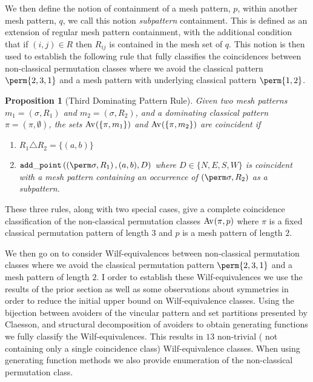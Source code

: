 \documentclass[11pt,a4paper]{article}
\newtheorem{proposition}[theorem]{Proposition}
\begin{document}
We then define the notion of containment of a mesh pattern, \(p\), within
another mesh pattern, \(q\), we call this notion \emph{subpattern} containment.
This is defined as an extension of regular mesh pattern containment, with the
additional condition that if \((i,j)\in R\text{ then } R_{ij}\) is contained in
the mesh set of \(q\). This notion is then used to establish the following rule
that fully classifies the coincidences between non-classical permutation classes
where we avoid the classical pattern \(\perm{2,3,1}\) and a mesh pattern with
underlying classical pattern \(\perm{1,2}\).
\begin{proposition}[Third Dominating Pattern Rule]
    \label{prop:dom3}
    Given two mesh patterns \(m_1 =(\sigma, R_1)\) and \(m_2 = (\sigma, R_2)\),
    and a dominating classical pattern \(\pi = (\pi,\emptyset)\), the sets
    \(\operatorname{Av}_{}\!\left(\{\pi,m_1\}\right)\) and \(\operatorname{Av}_{}\!\left(\{\pi,m_2\}\right)\) are coincident if
    \begin{enumerate}
        \item \(R_1 \triangle R_2 = \{(a,b)\}\)
        \item\label{prop:dom3:condocc} \(\addp[D]{\mperm{\sigma}{R_1}}{(a,b)}\)
            where \(D\in\{N,E,S,W\}\)
            is coincident with a mesh pattern containing an occurrence of
            \(\mperm{\sigma}{R_2}\) as a subpattern.
    \end{enumerate}
\end{proposition}

These three rules, along with two special cases, give a complete coincidence
classification of the non-classical permutation classes \(\operatorname{Av}_{}\!\left(\pi,p\right)\) where
\(\pi\) is a fixed classical permutation pattern of length \(3\) and \(p\) is a
mesh pattern of length \(2\).

We then go on to consider Wilf-equivalences between non-classical permutation
classes where we avoid the classical permutation pattern \(\perm{2,3,1}\) and
a mesh pattern of length \(2\). I order to establish these Wilf-equivalences
we use the results of the prior section as well as some observations about
symmetries in order to reduce the initial upper bound on Wilf-equivalence classes.
Using the bijection between avoiders of the vincular pattern
 and set partitions presented by
Claesson\cite{A}, and structural decomposition of avoiders to obtain generating
functions we fully classify the Wilf-equivalences. This results in \(13\)
non-trivial (\ie{} not containing only a single coincidence class) Wilf-equivalence
classes. When using generating function methods we also provide enumeration of
the non-classical permutation class.
\end{document}
